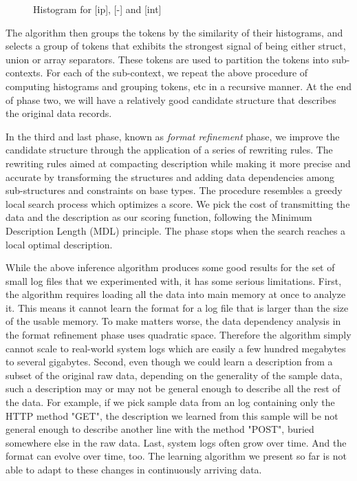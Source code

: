 \begin{figure}[th]
\begin{center}
\caption{Histogram for [ip], [-] and [int]}
\label{fig:histograms}
\end{center}
\end{figure}

The algorithm then groups the tokens by the similarity of their histograms,
and selects a group of tokens that exhibits the strongest signal of being
either struct, union or array separators. These tokens are used 
to partition the tokens into sub-contexts. For each of the sub-context,
we repeat the above procedure of computing histograms and grouping
tokens, etc in a recursive manner. At the end of phase two, we will have
a relatively good candidate structure that describes the original data records.

In the third and last phase, known as {\em format refinement} phase,
we improve the candidate structure through the application of a series of
rewriting rules. The rewriting rules aimed at compacting description while
making it more precise and accurate by transforming the structures and 
adding data dependencies among sub-structures and constraints on base types.
The procedure resembles a greedy local search process which optimizes a
score. We pick the cost of transmitting the data and the description as our
scoring function, following the Minimum Description Length (MDL) \cite{mdlbook} 
principle. The phase stops when the search reaches a local optimal description.

While the above inference algorithm produces some good results for the
set of small log files that we experimented with, it has some serious
limitations. First, the algorithm requires loading all the data into main
memory at once to analyze it. This means it cannot learn the format for a log
file that is larger than the size of the usable memory. To make matters worse, the
data dependency analysis in the format refinement phase uses quadratic space. 
Therefore the algorithm simply cannot scale to real-world
system logs which are easily a few hundred megabytes to several gigabytes. 
Second, even though we could learn a description from a subset of the original
raw data, depending on the generality of the sample data, such a description
may or may not be general enough to describe all the rest of the data.
For example, if we pick sample data from an \ai{} log containing only the HTTP 
method "GET", the description we learned from this sample will be not general enough to 
describe another line with the method "POST", buried somewhere else in the
raw data. Last, system logs often grow over time. And the format can evolve 
over time, too. The learning algorithm we present so far is not able to adapt to 
these changes in continuously arriving data. 

